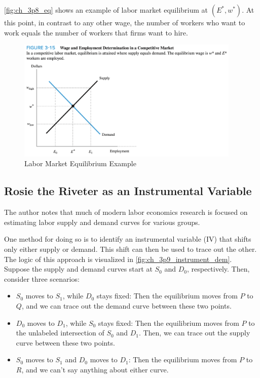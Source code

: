 \autoref{fig:ch_3p8_eq}
shows an example of labor market equilibrium
at $(E^*, w^*)$. At this point, in contrast to 
any other wage, the number of workers 
who want to work equals the number of workers
that firms want to hire.

\FloatBarrier

\begin{figure}[!htb]
    \centering
        \includegraphics[width=0.95\textwidth]{../input/ch_3p8_eq.png}
    \caption{Labor Market Equilibrium Example}
    \label{fig:ch_3p8_eq}
\end{figure}

\FloatBarrier


\subsection{Rosie the Riveter as an Instrumental Variable}

The author notes that much of modern 
labor economics research is focused on 
estimating labor supply and demand curves for 
various groups.

One method for doing so is to identify an 
instrumental variable (IV) that shifts
only either supply or demand.
This shift can then be used to trace out 
the other. The logic of this 
approach is visualized in 
\autoref{fig:ch_3p9_instrument_dem}.
Suppose the supply and demand 
curves start at $S_0$ and $D_0$, respectively.
Then, consider three scenarios:

\begin{itemize}
    \item $S_0$ moves to $S_1$, while $D_0$ stays fixed: Then 
        the equilibrium moves from $P$ to $Q$, and we can 
        trace out the demand curve between these two points.
    \item $D_0$ moves to $D_1$, while $S_0$ stays fixed: Then 
        the equilibrium moves from $P$ to the unlabeled 
        intersection of $S_0$ and $D_1$. 
        Then, we can trace out the supply curve between 
        these two points.
    \item $S_0$ moves to $S_1$ and $D_0$ moves to $D_1$: Then 
        the equilibrium moves from $P$ to $R$, and we can't 
        say anything about either curve.
\end{itemize}


